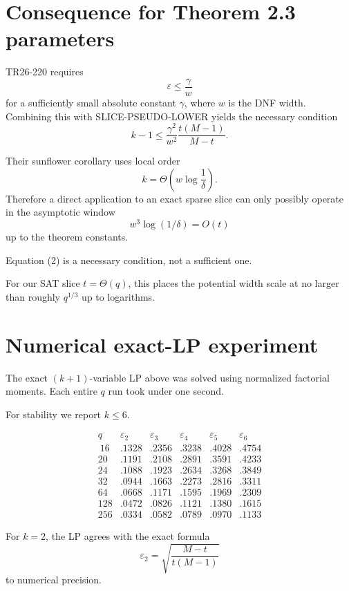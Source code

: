 \documentclass[11pt]{article}
\begin{document}
\section{Consequence for Theorem 2.3 parameters}

TR26-220 requires
\[
\varepsilon\le\frac\gamma w
\]
for a sufficiently small absolute constant \(\gamma\), where \(w\) is the
DNF width. Combining this with SLICE-PSEUDO-LOWER yields the necessary
condition
\[
k-1
\le
\frac{\gamma^2}{w^2}
\frac{t(M-1)}{M-t}.
\tag{1}
\]

Their sunflower corollary uses local order
\[
k=\Theta\left(w\log\frac1\delta\right).
\]
Therefore a direct application to an exact sparse slice can only possibly
operate in the asymptotic window
\[
\boxed{
w^3\log(1/\delta)=O(t)
}
\tag{2}
\]
up to the theorem constants.

Equation (2) is a necessary condition, not a sufficient one.

For our SAT slice \(t=\Theta(q)\), this places the potential width scale at
no larger than roughly \(q^{1/3}\) up to logarithms.

\section{Numerical exact-LP experiment}

The exact \((k+1)\)-variable LP above was solved using normalized factorial
moments. Each entire \(q\) run took under one second.

For stability we report \(k\le6\).

\[
\begin{array}{c|ccccc}
q & \varepsilon_2 & \varepsilon_3 & \varepsilon_4 &
\varepsilon_5 & \varepsilon_6 \\\
\hline
16  & .1328 & .2356 & .3238 & .4028 & .4754 \\
20  & .1191 & .2108 & .2891 & .3591 & .4233 \\
24  & .1088 & .1923 & .2634 & .3268 & .3849 \\
32  & .0944 & .1663 & .2273 & .2816 & .3311 \\
64  & .0668 & .1171 & .1595 & .1969 & .2309 \\
128 & .0472 & .0826 & .1121 & .1380 & .1615 \\
256 & .0334 & .0582 & .0789 & .0970 & .1133
\end{array}
\]

For \(k=2\), the LP agrees with the exact formula
\[
\varepsilon_2
=
\sqrt{
\frac{M-t}{t(M-1)}
}
\]
to numerical precision.
\end{document}
